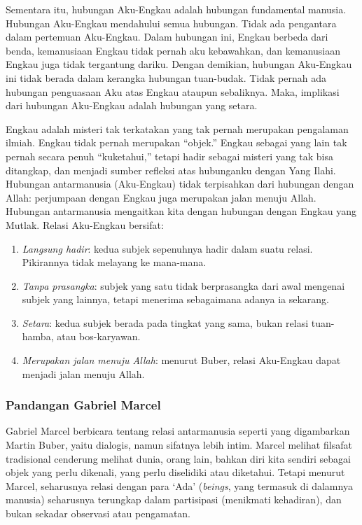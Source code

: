 \documentclass[10pt,a4paper]{article}
\def\tightlist{}
\begin{document}
\begin{multicols}{2}
Sementara itu, hubungan Aku-Engkau adalah hubungan fundamental manusia.
Hubungan Aku-Engkau mendahului semua hubungan. Tidak ada pengantara
dalam pertemuan Aku-Engkau. Dalam hubungan ini, Engkau berbeda dari
benda, kemanusiaan Engkau tidak pernah aku kebawahkan, dan kemanusiaan
Engkau juga tidak tergantung dariku. Dengan demikian, hubungan
Aku-Engkau ini tidak berada dalam kerangka hubungan tuan-budak. Tidak
pernah ada hubungan penguasaan Aku atas Engkau ataupun sebaliknya. Maka,
implikasi dari hubungan Aku-Engkau adalah hubungan yang setara.

Engkau adalah misteri tak terkatakan yang tak pernah merupakan
pengalaman ilmiah. Engkau tidak pernah merupakan ``objek.'' Engkau
sebagai yang lain tak pernah secara penuh ``kuketahui,'' tetapi hadir
sebagai misteri yang tak bisa ditangkap, dan menjadi sumber refleksi
atas hubunganku dengan Yang Ilahi. Hubungan antarmanusia (Aku-Engkau)
tidak terpisahkan dari hubungan dengan Allah: perjumpaan dengan Engkau
juga merupakan jalan menuju Allah. Hubungan antarmanusia mengaitkan kita
dengan hubungan dengan Engkau yang Mutlak. Relasi Aku-Engkau bersifat:

\begin{enumerate}
\def\labelenumi{\arabic{enumi}.}
\tightlist
\item
  \emph{Langsung hadir}: kedua subjek sepenuhnya hadir dalam suatu
  relasi. Pikirannya tidak melayang ke mana-mana.
\item
  \emph{Tanpa prasangka}: subjek yang satu tidak berprasangka dari awal
  mengenai subjek yang lainnya, tetapi menerima sebagaimana adanya ia
  sekarang.
\item
  \emph{Setara}: kedua subjek berada pada tingkat yang sama, bukan
  relasi tuan-hamba, atau bos-karyawan.
\item
  \emph{Merupakan jalan menuju Allah}: menurut Buber, relasi Aku-Engkau
  dapat menjadi jalan menuju Allah.
\end{enumerate}

\hypertarget{pandangan-gabriel-marcel}{%
\subsubsection{Pandangan Gabriel
Marcel}\label{pandangan-gabriel-marcel}}

Gabriel Marcel berbicara tentang relasi antarmanusia seperti yang
digambarkan Martin Buber, yaitu dialogis, namun sifatnya lebih intim.
Marcel melihat filsafat tradisional cenderung melihat dunia, orang lain,
bahkan diri kita sendiri sebagai objek yang perlu dikenali, yang perlu
diselidiki atau diketahui. Tetapi menurut Marcel, seharusnya relasi
dengan para `Ada' (\emph{beings}, yang termasuk di dalamnya manusia)
seharusnya terungkap dalam partisipasi (menikmati kehadiran), dan bukan
sekadar observasi atau pengamatan.


\end{multicols}
\end{document}
